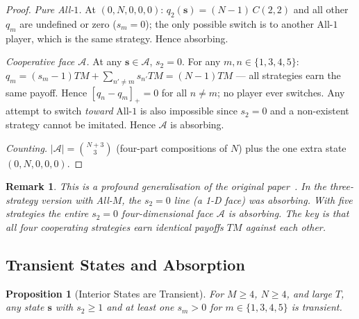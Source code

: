 \documentclass[12pt,a4paper]{article}
\newtheorem{proposition}{Proposition}[section]
\newtheorem{remark}{Remark}[section]
\begin{document}
\begin{proof}
\textit{Pure All-$1$.}  At $(0,N,0,0,0)$: $q_2(\mathbf{s})=(N-1)\,C(2,2)$ and
all other $q_m$ are undefined or zero ($s_m=0$); the only possible switch is
to another All-$1$ player, which is the same strategy.  Hence absorbing.

\textit{Cooperative face $\mathcal{A}$.}  At any
$\mathbf{s}\in\mathcal{A}$, $s_2=0$.  For any $m,n\in\{1,3,4,5\}$:
$q_m=(s_m-1)TM+\sum_{n'\neq m}s_{n'}TM=(N-1)TM$ --- all strategies earn the
same payoff.  Hence $[q_n-q_m]_+=0$ for all $n\neq m$; no player ever switches.
Any attempt to switch \emph{toward} All-$1$ is also impossible since $s_2=0$
and a non-existent strategy cannot be imitated.  Hence $\mathcal{A}$ is absorbing.

\textit{Counting.}  $|\mathcal{A}|=\binom{N+3}{3}$ (four-part compositions of
$N$) plus the one extra state $(0,N,0,0,0)$.
\end{proof}

\begin{remark}
This is a profound generalisation of the original paper~\cite{LK2026}.
In the three-strategy version with All-$M$, the $s_2=0$ line (a 1-D face)
was absorbing.  With five strategies the entire $s_2=0$ four-dimensional
face $\mathcal{A}$ is absorbing.  The key is that all four cooperating
strategies earn identical payoffs $TM$ against each other.
\end{remark}

\subsection{Transient States and Absorption}

\begin{proposition}[Interior States are Transient]\label{prop:transient}
For $M\geq 4$, $N\geq 4$, and large $T$, any state $\mathbf{s}$ with
$s_2\geq 1$ and at least one $s_m>0$ for $m\in\{1,3,4,5\}$ is transient.
\end{proposition}
\end{document}
